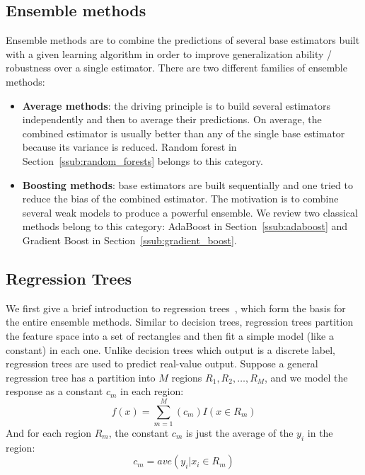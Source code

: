 \subsection{Ensemble methods}
\label{sub:ensemble_methods}
Ensemble methods are to combine the predictions of several base estimators
built with a given learning algorithm in order to improve generalization
ability / robustness over a single estimator.
There are two different families of ensemble methods:
\begin{itemize}
	\item \textbf{Average methods}: the driving principle is to build
	  several estimators independently and then to average their
	  predictions. On average, the combined estimator is usually better
	  than any of the single base estimator because its variance is
	  reduced. Random forest in Section~\ref{ssub:random_forests} belongs
	  to this category.
	\item \textbf{Boosting methods}: base estimators are built sequentially
	  and one tried to reduce the bias of the combined estimator. The
	  motivation is to combine several weak models to produce a powerful
	  ensemble. We review two classical methods belong to this category:
	  AdaBoost in Section~\ref{ssub:adaboost} and Gradient Boost in
	  Section~\ref{ssub:gradient_boost}.
\end{itemize}

\subsection{Regression Trees}
\label{ssub:regression_tree}
We first give a brief introduction to regression
trees~\cite{hastie2009elements}, which form the basis for the entire ensemble
methods. Similar to decision trees, regression trees partition the feature
space into a set of rectangles and then fit a simple model (like a constant) in
each one. Unlike decision trees which output is a discrete label, regression
trees are used to predict real-value output. Suppose a general regression tree
has a partition into $M$ regions $R_1, R_2, \ldots, R_M$, and we model the
response as a constant $c_m$ in each region:
\begin{equation}
	f(x) = \sum \limits_{m=1}^{M} (c_m)I(x \in R_m)
\end{equation}
And for each region $R_m$, the constant $c_m$ is just the average of the $y_i$ in the region:
\begin{equation}
	c_m  = ave(y_i | x_i \in R_m)
\end{equation}

